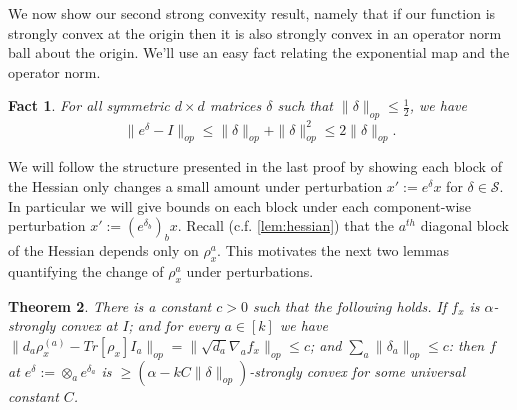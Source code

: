 \documentclass{article}
\newtheorem{theorem}{Theorem}
\newtheorem{fact}[theorem]{Fact}
\newcommand\Sym{\mathcal{S}}
\newcommand\samp{x}
\newcommand\tr{\operatorname{Tr}}
\newcommand{\CF}[1]{{\color{purple}[CF: #1]}}
\begin{document}



We now show our second strong convexity result, namely that if our function is strongly convex at the origin then it is also strongly convex in an operator norm ball about the origin. We'll use an easy fact relating the exponential map and the operator norm.

\begin{fact} For all symmetric $d\times d$ matrices $\delta $ such that $ \|\delta\|_{op} \leq \frac{1}{2}$, we have 
$$ \|e^{\delta} - I\|_{op} \leq \|\delta\|_{op} + \|\delta\|_{op}^{2} \leq 2 \|\delta\|_{op}.$$ 
\end{fact}

We will follow the structure presented in the last proof %
by showing each block of the Hessian only changes a small amount under perturbation $x' := e^{\delta} x$ for $\delta \in \Sym$. In particular we will give bounds on each block under each component-wise perturbation $x' := (e^{\delta_{b}})_{b} x$. Recall (c.f. \cref{lem:hessian}) that the $a^{th}$ diagonal block of the Hessian depends only on $\rho^a_{\samp}$. This motivates the next two lemmas quantifying the change of $\rho^{a}
_{\samp}$ under perturbations. 

\begin{theorem} \label{convexRobustness}
There is a constant $c>0$ such that the following holds. If $f_{\samp}$ is $\alpha$-strongly convex at $I$; and for every $a \in [k]$ we have $\|d_{a} \rho_{\samp}^{(a)} - Tr[\rho_{\samp}] I_{a}\|_{op} = \|\sqrt{d_{a}} \nabla_{a} f_{\samp}\|_{op} \leq c$; and $\sum_{a} \|\delta_{a}\|_{op} \leq c$: then $f$ at $e^{\delta} := \otimes_{a} e^{\delta_{a}}$ is $\geq (\alpha - k C \|\delta\|_{op})$-strongly convex for some universal constant $C$. 
\end{theorem}
\end{document}
